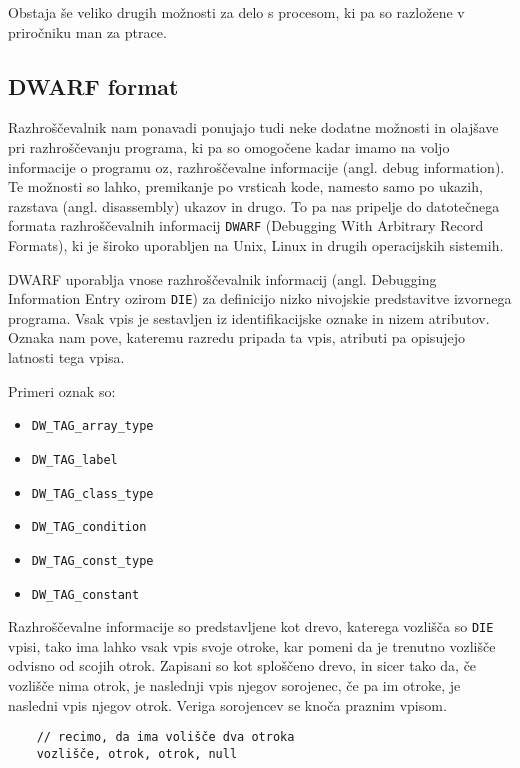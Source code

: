 \documentclass[a4paper,notitlepage]{article}
\newcommand{\code}[1]{\texttt{#1}}
\begin{document}
Obstaja še veliko drugih možnosti za delo s procesom, ki pa so razložene v priročniku man za ptrace\cite{ptrace-man-page}.

\subsection{DWARF format}

Razhroščevalnik nam ponavadi ponujajo tudi neke dodatne možnosti in olajšave pri razhroščevanju programa, ki pa so omogočene kadar imamo na voljo informacije o programu oz, razhroščevalne informacije (angl. debug information).
Te možnosti so lahko, premikanje po vrsticah kode, namesto samo po ukazih, razstava (angl. disassembly) ukazov in drugo.
To pa nas pripelje do datotečnega formata razhroščevalnih informacij \code{DWARF} (Debugging With Arbitrary Record Formats)\cite{dwarf-web-page}, ki je široko uporabljen na Unix, Linux in drugih operacijskih sistemih.

DWARF uporablja vnose razhroščevalnik informacij (angl. Debugging Information Entry ozirom \code{DIE}) za definicijo nizko nivojskie predstavitve izvornega programa.
Vsak vpis je sestavljen iz identifikacijske oznake in nizem atributov. Oznaka nam pove, kateremu razredu pripada ta vpis, atributi pa opisujejo latnosti tega vpisa.

Primeri oznak so:
\begin{itemize}
    \item \code{DW_TAG_array_type}
    \item \code{DW_TAG_label}
    \item \code{DW_TAG_class_type}
    \item \code{DW_TAG_condition}
    \item \code{DW_TAG_const_type}
    \item \code{DW_TAG_constant}
\end{itemize}

Razhroščevalne informacije so predstavljene kot drevo, katerega vozlišča so \code{DIE} vpisi, tako ima lahko vsak vpis svoje otroke, kar pomeni da je trenutno vozlišče odvisno od scojih otrok.
Zapisani so kot sploščeno drevo, in sicer tako da, če vozlišče nima otrok, je naslednji vpis njegov sorojenec, če pa im otroke, je nasledni vpis njegov otrok. Veriga sorojencev se knoča praznim vpisom.

\begin{verbatim}
    // recimo, da ima volišče dva otroka
    vozlišče, otrok, otrok, null
\end{verbatim}
\end{document}
